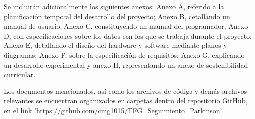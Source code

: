 Se incluirán adicionalmente los siguientes anexos: Anexo A, referido a la planificación temporal del desarrollo del proyecto; Anexo B, detallando un manual de usuario; Anexo C, constituyendo un manual del programador; Anexo D, con especificaciones sobre los datos con los que se trabaja durante el proyecto; Anexo E, detallando el diseño del hardware y software mediante planos y diagramas; Anexo F, sobre la especificación de requisitos; Anexo G, explicando un desarrollo experimental y anexo H, representando un anexo de sostenibilidad curricular.

Los documentos mencionados, así como los archivos de código y demás archivos relevantes se encuentran organizados en carpetas dentro del repositorio \href{https://github.com/cmg1015/TFG_Seguimiento_Parkinson}{GitHub}, en el link '\url{https://github.com/cmg1015/TFG_Seguimiento_Parkinson}'.




